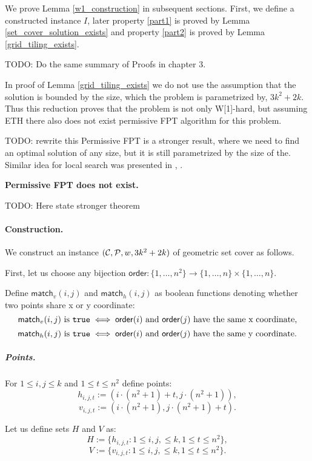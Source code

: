 We prove Lemma \ref{w1_construction} in subsequent sections.
First, we define a constructed instance $I$, later property
\ref{part1} is proved by Lemma \ref{set_cover_solution_exists}
and property \ref{part2} is proved by Lemma \ref{grid_tiling_exists}.

TODO: Do the same summary of Proofs in chapter 3.

In proof of Lemma \ref{grid_tiling_exists}
we do not use the assumption that
the solution is bounded by the size,
which the problem is parametrized by, $3k^2+2k$.
Thus this reduction
proves that the problem is not only W[1]-hard, but assuming ETH 
there also does not exist permissive FPT algorithm for this problem.

TODO: rewrite this
Permissive FPT is a stronger result, where 
we need to find an optimal solution
of any size, but it is still parametrized
by the size of the.
Similar idea for local search was presented in \cite{permissive_problem1}, \cite{permissive_problem2}.

\begin{tw}
\textbf{Permissive FPT does not exist.}

TODO: Here state stronger theorem
\end{tw}

\paragraph{Construction.}
\newcommand{\order}{\mathsf{order}}
\newcommand{\matchv}{\mathsf{match}_v}
\newcommand{\matchh}{\mathsf{match}_h}

We construct an instance $(\mathcal{C}, \mathcal{P}, w, 3k^2+2k)$ of geometric set cover as follows.

First, let us choose any bijection
$\order : \{1, \ldots, n^2\} \rightarrow \{1, \ldots, n\} \times \{1, \ldots, n\}$.


Define $\matchv(i, j)$ and $\matchh(i, j)$
as boolean functions denoting whether two points share x or y coordinate:
$$\matchv(i, j) \text{ is } \true \iff
\order(i) \text{ and } \order(j) \text{ have the same x coordinate,}$$
$$\matchh(i, j) \text{ is } \true \iff
\order(i) \text{ and } \order(j) \text{ have the same y coordinate.}$$


\subparagraph{Points.}

For $1 \le i,j \le k$ and $1 \le t \le n^2$ define points:
	$$h_{i, j, t} := (i \cdot (n^2+1) + t, j \cdot (n^2+1)),$$
	$$v_{i, j, t} := (i \cdot (n^2+1), j \cdot (n^2+1) + t).$$
	
Let us define sets $H$ and $V$ as:
$$H := \{h_{i, j, t} : 1 \le i, j, \le k, 1 \le t \le n^2\},$$
$$V := \{v_{i, j, t} : 1 \le i, j, \le k, 1 \le t \le n^2\}.$$
	
